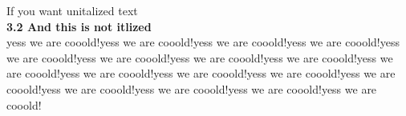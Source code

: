 \documentclass[asymmetric, a4paper]{article}
\begin{document}
\begin{multicols*}{2}
	{If you want unitalized text \\
	\parindent0pt \textbf{3.2 And this is not itlized}
}\\
yess we are cooold!yess we are cooold!yess we are cooold!yess we are cooold!yess we are cooold!yess we are cooold!yess we are cooold!yess we are cooold!yess we are cooold!yess we are cooold!yess we are cooold!yess we are cooold!yess we are cooold!yess we are cooold!yess we are cooold!yess we are cooold!yess we are cooold!
\end{multicols*}
\end{document}

